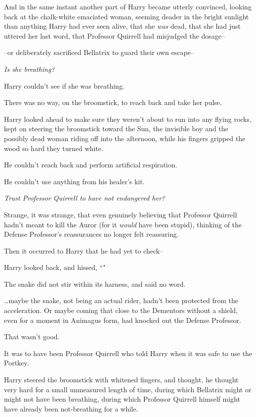And in the same instant another part of Harry became utterly convinced, looking back at the chalk-white emaciated woman, seeming deader in the bright sunlight than anything Harry had ever seen alive, that she \emph{was} dead, that she had just uttered her last word, that Professor Quirrell had misjudged the dosage\---

\---or deliberately sacrificed Bellatrix to guard their own escape\---

\emph{Is she breathing?}

Harry couldn't see if she was breathing.

There was no way, on the broomstick, to reach back and take her pulse.

Harry looked ahead to make sure they weren't about to run into any flying rocks, kept on steering the broomstick toward the Sun, the invisible boy and the possibly dead woman riding off into the afternoon, while his fingers gripped the wood so hard they turned white.

He couldn't reach back and perform artificial respiration.

He couldn't use anything from his healer's kit.

\emph{Trust Professor Quirrell to have not endangered her?}

Strange, it was strange, that even genuinely believing that Professor Quirrell hadn't meant to kill the Auror (for it \emph{would} have been stupid), thinking of the Defense Professor's reassurances no longer felt reassuring.

Then it occurred to Harry that he had yet to check\---

Harry looked back, and hissed, ``"

The snake did not stir within its harness, and said no word.

{\ldots}maybe the snake, not being an actual rider, hadn't been protected from the acceleration. Or maybe coming that close to the Dementors without a shield, even for a moment in Animagus form, had knocked out the Defense Professor.

That wasn't good.

It was to have been Professor Quirrell who told Harry when it was safe to use the Portkey.

Harry steered the broomstick with whitened fingers, and thought, he thought very hard for a small unmeasured length of time, during which Bellatrix might or might not have been breathing, during which Professor Quirrell himself might have already been not-breathing for a while.

